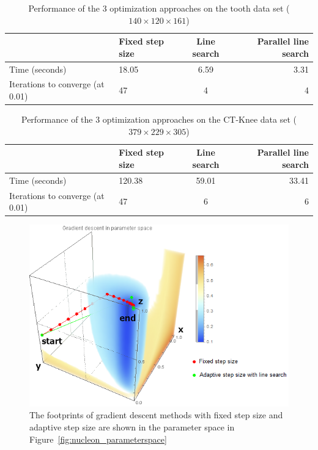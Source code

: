\begin{table}[h]
	\begin{tabular}{ l | l c r }
		& Fixed step size & Line search & Parallel line search \\
		\hline
		Time (seconds) & 18.05 & 6.59 & 3.31 \\
		Iterations to converge (at 0.01) & 47 & 4 & 4 \\
	\end{tabular}
	\caption[Table caption text]{Performance of the 3 optimization approaches on the tooth data set ($ 140 \times 120 \times 161 $)}
	\label{table:tooth_table}
\end{table}

\begin{table}[h]
	\begin{tabular}{ l | l c r }
		& Fixed step size & Line search & Parallel line search \\
		\hline
		Time (seconds) & 120.38 & 59.01 & 33.41 \\
		Iterations to converge (at 0.01) & 47 & 6 & 6 \\
	\end{tabular}
	\caption[Table caption text]{Performance of the 3 optimization approaches on the CT-Knee data set ($ 379 \times 229 \times 305 $)}
	\label{table:CT-Knee_table}
\end{table}

\begin{figure}
	\centering
	\begin{minipage}{.9\textwidth}
		\includegraphics[width=1\linewidth]{images/parameterspace_path}
	\end{minipage}
	\caption{The footprints of gradient descent methods with fixed step size and adaptive step size are shown in the parameter space in Figure~\ref{fig:nucleon_parameterspace}}
	\label{fig:nucleon_parameterspace_path}
\end{figure}

